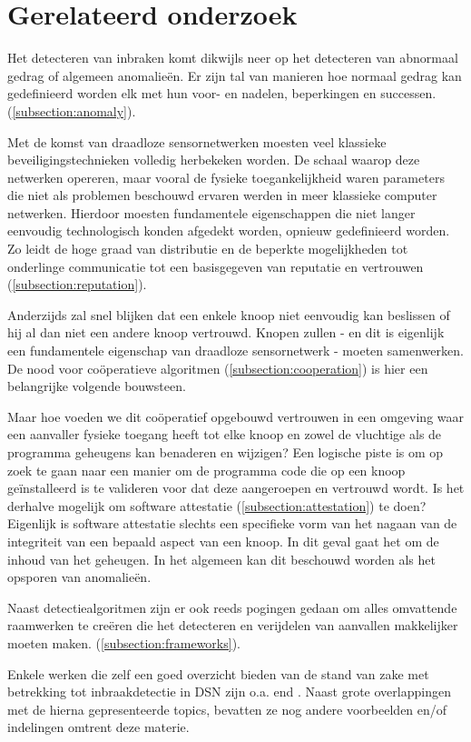 \section{Gerelateerd onderzoek}
\label{section:related}

Het detecteren van inbraken komt dikwijls neer op het detecteren van abnormaal
gedrag of algemeen anomalie\"en. Er zijn tal van manieren hoe normaal gedrag
kan gedefinieerd worden elk met hun voor- en nadelen, beperkingen en successen.
(\ref{subsection:anomaly}).

Met de komst van draadloze sensornetwerken moesten veel klassieke
beveiligingstechnieken volledig herbekeken worden. De schaal waarop deze
netwerken opereren, maar vooral de fysieke toegankelijkheid waren parameters
die niet als problemen beschouwd ervaren werden in meer klassieke computer
netwerken. Hierdoor moesten fundamentele eigenschappen die niet langer
eenvoudig technologisch konden afgedekt worden, opnieuw gedefinieerd worden. Zo
leidt de hoge graad van distributie en de beperkte mogelijkheden tot onderlinge
communicatie tot een basisgegeven van reputatie en vertrouwen
(\ref{subsection:reputation}).

Anderzijds zal snel blijken dat een enkele knoop niet eenvoudig kan beslissen
of hij al dan niet een andere knoop vertrouwd. Knopen zullen - en dit is
eigenlijk een fundamentele eigenschap van draadloze sensornetwerk - moeten
samenwerken. De nood voor co\"operatieve algoritmen
(\ref{subsection:cooperation}) is hier een belangrijke volgende bouwsteen.

Maar hoe voeden we dit co\"operatief opgebouwd vertrouwen in een omgeving waar
een aanvaller fysieke toegang heeft tot elke knoop en zowel de vluchtige als de
programma geheugens kan benaderen en wijzigen? Een logische piste is om op zoek
te gaan naar een manier om de programma code die op een knoop ge\"installeerd
is te valideren voor dat deze aangeroepen en vertrouwd wordt. Is het derhalve
mogelijk om software attestatie (\ref{subsection:attestation}) te doen?
Eigenlijk is software attestatie slechts een specifieke vorm van het nagaan van
de integriteit van een bepaald aspect van een knoop. In dit geval gaat het om
de inhoud van het geheugen. In het algemeen kan dit beschouwd worden als het
opsporen van anomalie\"en.

Naast detectiealgoritmen zijn er ook reeds pogingen gedaan om alles omvattende
raamwerken te cre\"eren die het detecteren en verijdelen van aanvallen
makkelijker moeten maken. (\ref{subsection:frameworks}).

Enkele werken die zelf een goed overzicht bieden van de stand van zake met
betrekking tot inbraakdetectie in DSN zijn o.a. \cite{mishra2004intrusion} end
\cite{alrajeh2013intrusion}. Naast grote overlappingen met de hierna
gepresenteerde topics, bevatten ze nog andere voorbeelden en/of indelingen
omtrent deze materie.







